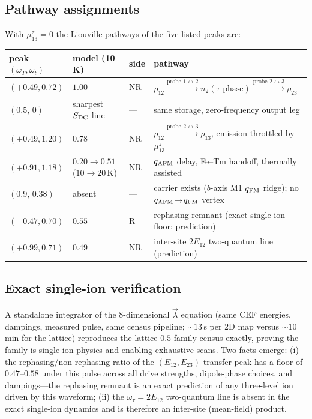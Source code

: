\documentclass[11pt]{article}
\newcommand{\qafm}{q_{\rm AFM}}
\newcommand{\qfm}{q_{\rm FM}}
\begin{document}
\subsection{Pathway assignments}
With $\mu^z_{13}=0$ the Liouville pathways of the five listed peaks are:
\begin{center}\small
\renewcommand{\arraystretch}{1.3}
\begin{tabular}{llll}
\toprule
peak $(\omega_T,\omega_t)$ & model (10\,K) & side & pathway\\
\midrule
$(+0.49,0.72)$ & $1.00$ & NR &
  $\rho_{12}\xrightarrow{\text{probe }1\leftrightarrow2}n_2(\tau\text{-phase})
  \xrightarrow{\text{probe }2\leftrightarrow3}\rho_{23}$\\
$(0.5,\,0)$ & sharpest $S_{\rm DC}$ line & --- &
  same storage, zero-frequency output leg\\
$(+0.49,1.20)$ & $0.78$ & NR &
  $\rho_{12}\xrightarrow{\text{probe }2\leftrightarrow3}\rho_{13}$,
  emission throttled by $\mu^z_{13}$\\
$(+0.91,1.18)$ & $0.20\to0.51$ ($10\to20$\,K) & NR &
  $\qafm$ delay, Fe--Tm handoff, thermally assisted\\
$(0.9,\,0.38)$ & absent & --- & carrier exists ($b$-axis M1 $\qfm$
  ridge); no $\qafm\!\to\!\qfm$ vertex\\
\midrule
$(-0.47,0.70)$ & $0.55$ & R & rephasing remnant (exact single-ion
  floor; prediction)\\
$(+0.99,0.71)$ & $0.49$ & NR & inter-site $2E_{12}$ two-quantum line
  (prediction)\\
\bottomrule
\end{tabular}
\end{center}

\subsection{Exact single-ion verification}
A standalone integrator of the 8-dimensional $\vec\lambda$ equation
(same CEF energies, dampings, measured pulse, same census pipeline;
$\sim13$\,s per 2D map versus $\sim10$\,min for the lattice) reproduces
the lattice $0.5$-family census exactly, proving the family is
single-ion physics and enabling exhaustive scans.  Two facts emerge:
(i) the rephasing/non-rephasing ratio of the $(E_{12},E_{23})$ transfer
peak has a floor of $0.47$--$0.58$ under this pulse across all drive
strengths, dipole-phase choices, and dampings---the rephasing remnant is
an exact prediction of any three-level ion driven by this waveform;
(ii) the $\omega_\tau=2E_{12}$ two-quantum line is absent in the exact
single-ion dynamics and is therefore an inter-site (mean-field) product.
\end{document}
